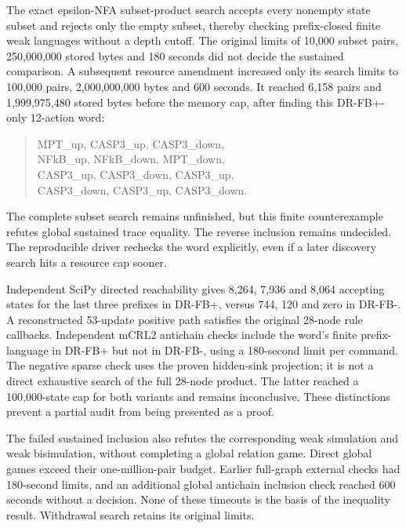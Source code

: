 \documentclass{ws-jbcb}
\numberwithin{equation}{section}
\newcommand{\DRBaseSubsetBytes}{1{,}999{,}975{,}480}
\newcommand{\DRBaseSubsetPairs}{6{,}158}
\begin{document}
The exact epsilon-NFA subset-product search accepts every nonempty state
subset and rejects only the empty subset, thereby checking prefix-closed
finite weak languages without a depth cutoff. The original limits of 10,000
subset pairs, 250,000,000 stored bytes and 180 seconds did not decide the
sustained comparison. A subsequent resource amendment increased only its
search limits to 100,000 pairs, 2,000,000,000 bytes and 600 seconds. It reached
\DRBaseSubsetPairs{} pairs and \DRBaseSubsetBytes{} stored bytes before the
memory cap, after finding this DR-FB+-only 12-action word:
\begin{quote}\small\raggedright
MPT\_up, CASP3\_up, CASP3\_down,\\
NFkB\_up, NFkB\_down, MPT\_down,\\
CASP3\_up, CASP3\_down, CASP3\_up,\\
CASP3\_down, CASP3\_up, CASP3\_down.
\end{quote}
The complete subset search remains unfinished, but this finite counterexample
refutes global sustained trace equality. The reverse inclusion remains
undecided. The reproducible driver rechecks the word explicitly, even if a
later discovery search hits a resource cap sooner.

Independent SciPy directed reachability gives 8,264, 7,936 and 8,064 accepting
states for the last three prefixes in DR-FB+, versus 744, 120 and zero in
DR-FB-. A reconstructed 53-update positive path satisfies the original
28-node rule callbacks. Independent mCRL2 antichain checks include the word's
finite prefix-language in DR-FB+ but not in DR-FB-, using a 180-second limit
per command. The negative sparse check uses the proven hidden-sink projection;
it is not a direct exhaustive search of the full 28-node product. The latter
reached a 100,000-state cap for both variants and remains inconclusive.
These distinctions prevent a partial audit from being presented as a proof.

The failed sustained inclusion also refutes the corresponding weak simulation
and weak bisimulation, without completing a global relation game. Direct
global games exceed their one-million-pair budget. Earlier full-graph external
checks had 180-second limits, and an additional global antichain inclusion
check reached 600 seconds without a decision. None of these timeouts is the
basis of the inequality result. Withdrawal search retains its original limits.
\end{document}

